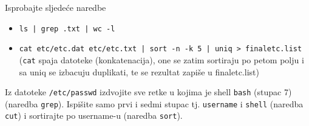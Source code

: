 \begin{primjer} Isprobajte sljedeće naredbe
\begin{itemize}
\item \texttt{ls | grep .txt | wc -l }
\item \texttt{cat etc/etc.dat etc/etc.txt | sort -n -k 5 | uniq > finaletc.list}  (\texttt{cat} spaja datoteke (konkatenacija), 
one se zatim sortiraju po petom polju i sa uniq se izbacuju duplikati, te se rezultat zapiše u finaletc.list)
\end{itemize}
\end{primjer}

\begin{zadatak} 
Iz datoteke \texttt{/etc/passwd} izdvojite sve retke u kojima je shell \texttt{bash} (stupac 7) (naredba \texttt{grep}). Ispišite samo prvi i sedmi stupac tj. \texttt{username} i \texttt{shell} (naredba \texttt{cut}) i sortirajte po username-u (naredba \texttt{sort}). 
\end{zadatak}

\begin{comment}

\vfill
\begin{itemize}
\renewcommand{\labelitemi}{\textbf{$\rightarrow$}}
\item Popis svih pokrenutih naredbi eksportirajte u datoteku imena \texttt{prezime\_ime\_vj6.txt}. Uploadajte datoteku na \href{https://moodle.oss.unist.hr/course/view.php?id=133}{http://moodle.oss.unist.hr}.
\end{itemize}

\end{comment}


